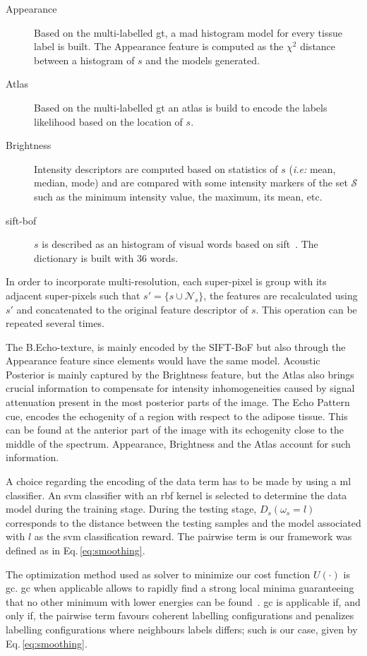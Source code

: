 \begin{description}
  \item[Appearance] 
    Based on the multi-labelled \ac{gt}, a \ac{mad} histogram model for every tissue label is built. The Appearance feature is computed as the $\chi^2$ distance between a histogram of $s$ and the models generated.
  \item[Atlas] 
    Based on the multi-labelled \ac{gt} an atlas is build to encode the labels likelihood based on the location of $s$.
  \item[Brightness] 
    Intensity descriptors are computed based on statistics of $s$ (\emph{i.e:} mean, median, mode) and  are compared with some intensity markers of the set $\mathcal{S}$ such as the minimum intensity value, the maximum, its mean, etc.
  \item[\ac{sift}-\ac{bof}]
    $s$ is described as an histogram of visual words based on \ac{sift}~\cite{massich2014sift}. The dictionary is built with $36$ words.
\end{description}

In order to incorporate multi-resolution, each super-pixel is group with its adjacent super-pixels such that $s' = \{s \cup \mathcal{N}_{s}\}$, the features are recalculated using $s'$ and concatenated to the original feature descriptor of $s$.
This operation can be repeated several times.

The B.Echo-texture, is mainly encoded by the SIFT-BoF but also through the Appearance feature since elements would have the same model.
Acoustic Posterior is mainly captured by the Brightness feature, but the Atlas also brings crucial information to compensate for intensity inhomogeneities caused by signal attenuation present in the most posterior parts of the image.
The Echo Pattern cue, encodes the echogenity of a region with respect to the adipose tissue. This can be found at the anterior part of the image with its echogenity close to the middle of the spectrum. Appearance, Brightness and the Atlas account for such information.

 A choice regarding the encoding of the data term has to be made by using a \ac{ml} classifier. An \ac{svm} classifier  with an \ac{rbf} kernel is selected to determine the data model during the training stage. During the testing stage, $D_s(\omega_s=l)$ corresponds to the distance between the testing samples and the model associated with $l$ as the \ac{svm} classification reward. The pairwise term is our framework was defined as in Eq.\,\eqref{eq:smoothing}.

The optimization method used as solver to minimize our cost function $U(\cdot)$ is \ac{gc}. \ac{gc} when applicable allows to rapidly find a strong local minima guaranteeing that no other minimum with lower energies can be found~\cite{delong2012fast}. 
\ac{gc} is applicable if, and only if, the pairwise term favours coherent labelling configurations and penalizes labelling configurations where neighbours labels differs; 
such is our case, given by Eq.\,\eqref{eq:smoothing}.

